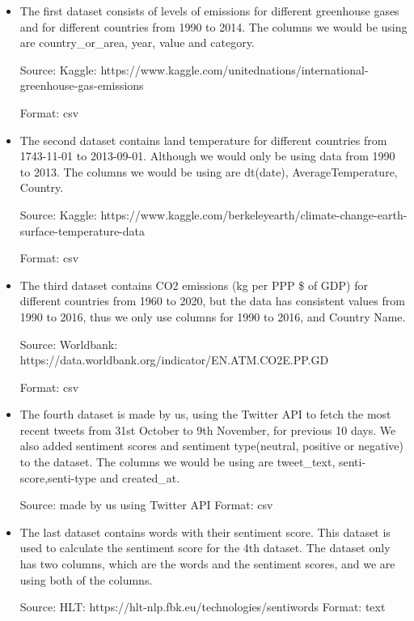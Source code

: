 \documentclass[a4paper, 11pt]{report}
\begin{document}
\begin{itemize}
    \item The first dataset consists of levels of emissions for different greenhouse gases and for different countries from 1990 to 2014. The columns we would be using are country\_or\_area, year, value and category.

    Source: Kaggle: https://www.kaggle.com/unitednations/international-greenhouse-gas-emissions

    Format: csv \\

    \item The second dataset contains land temperature for different countries from 1743-11-01 to 2013-09-01. Although we would only be using data from 1990 to 2013. The columns we would be using are dt(date), AverageTemperature, Country.

        Source: Kaggle: https://www.kaggle.com/berkeleyearth/climate-change-earth-surface-temperature-data

        Format: csv \\


    \item The third dataset contains CO2 emissions (kg per PPP \$ of GDP) for different countries from 1960 to 2020, but the data has consistent values from 1990 to 2016, thus we only use columns for 1990 to 2016, and Country Name.

    Source: Worldbank: https://data.worldbank.org/indicator/EN.ATM.CO2E.PP.GD

    Format: csv\\

    \item The fourth dataset is made by us, using the Twitter API to fetch the most recent tweets from 31st October to 9th November, for previous 10 days. We also added sentiment scores and sentiment type(neutral, positive or negative) to the dataset. The columns we would be using are tweet\_text, senti-score,senti-type and created\_at.

    Source: made by us using Twitter API \hspace{.5cm} Format: csv \\

    \item The last dataset contains words with their sentiment score. This dataset is used to calculate the sentiment score for the 4th dataset. The dataset only has two columns, which are the words and the sentiment scores, and we are using both of the columns.

    Source: HLT: https://hlt-nlp.fbk.eu/technologies/sentiwords \hspace{.5cm} Format: text
\end{itemize}
\end{document}
